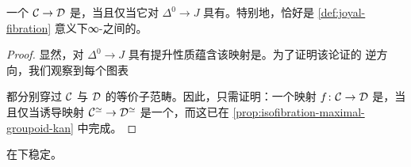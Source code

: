 \begin{proposition}\label{prop:isofibration-rlp-j}
一个\trInnerFibration{} $\mathcal{C} \to \mathcal{D}$ 是\trIsofibration{}，当且仅当它对
$\Delta^0 \to J$ 具有\trRightLiftingProperty{}。特别地，\trIsofibration{}恰好是
\cref{def:joyal-fibration} 意义下∞-\trCategories{}之间的\trJoyalFibration{}。
\end{proposition}

\begin{proof}
显然，对 $\Delta^0 \to J$ 具有提升性质蕴含该映射是\trIsofibration{}。为了证明该论证的
逆方向，我们观察到每个图表
\begin{center}
\end{center}
都分别穿过 $\mathcal{C}$ 与 $\mathcal{D}$ 的等价子范畴。因此，只需证明：一个映射
$f\colon \mathcal{C} \to \mathcal{D}$ 是\trIsofibration{}，当且仅当诱导映射
$\mathcal{C}^{\simeq} \to \mathcal{D}^{\simeq}$ 是一个\trKanFibration{}，而这已在%
\cref{prop:isofibration-maximal-groupoid-kan} 中完成。
\end{proof}

\begin{corollary}\label{cor:isofibration-stable-pullback}
\trIsofibration{}在\trPullback{}下稳定。
\end{corollary}
